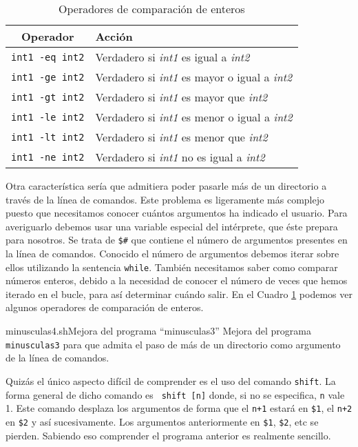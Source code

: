 \begin{table}[hbtp]
\centering
\begin{tabular}{|c|l|}
\hline
Operador		&	Acción \\
\hline
\hline
{\tt int1 -eq int2}	&	Verdadero si {\em int1} es igual a {\em int2} \\
\hline
{\tt int1 -ge int2}	&	Verdadero si {\em int1} es mayor o igual a {\em int2} \\
\hline
{\tt int1 -gt int2}	&	Verdadero si {\em int1} es mayor que {\em int2} \\
\hline
{\tt int1 -le int2}	&	Verdadero si {\em int1} es menor o igual a {\em int2} \\
\hline
{\tt int1 -lt int2}	&	Verdadero si {\em int1} es menor que {\em int2} \\
\hline
{\tt int1 -ne int2}	&	Verdadero si {\em int1} no es igual a {\em int2} \\
\hline
\end{tabular}
\caption{Operadores de comparación de enteros}\label{enteros}
\end{table}

Otra  característica  sería que  admitiera  poder  pasarle más  de  un
directorio  a  través  de  la  línea de  comandos.  Este  problema  es
ligeramente  más  complejo  puesto  que  necesitamos  conocer  cuántos
argumentos ha indicado  el usuario. Para averiguarlo  debemos usar una
variable especial del  intérprete, que éste prepara  para nosotros. Se
trata de {\tt \$\#} que contiene  el número de argumentos presentes en
la línea de comandos. Conocido el número de argumentos debemos  iterar
sobre  ellos utilizando la sentencia {\tt while}. También
necesitamos  saber  como  comparar  números  enteros,   debido   a  la
necesidad de conocer el número de veces que hemos iterado en el bucle,
para así determinar  cuándo salir. En el  Cuadro \ref{enteros} podemos
ver algunos operadores de comparación de enteros.

\begin{ejemplo}{minusculas4.sh}{Mejora del programa ``minusculas3''}
Mejora del programa {\tt minusculas3} para que admita el paso
de más de un directorio como argumento de la línea de comandos.
\end{ejemplo}

Quizás el  único aspecto difícil de  comprender es el uso  del comando
{\tt shift}.  La forma general  de dicho comando  es {\tt
shift [n]}  donde, si no se  especifica, {\tt n} vale  1. Este comando
desplaza los argumentos de forma que el {\tt n+1} estará en {\tt \$1},
el  {\tt  n+2}  en  {\tt  \$2} y  así  sucesivamente.  Los  argumentos
anteriormente en  {\tt \$1}, {\tt  \$2}, etc se pierden.  Sabiendo eso
comprender el programa anterior es realmente sencillo.


